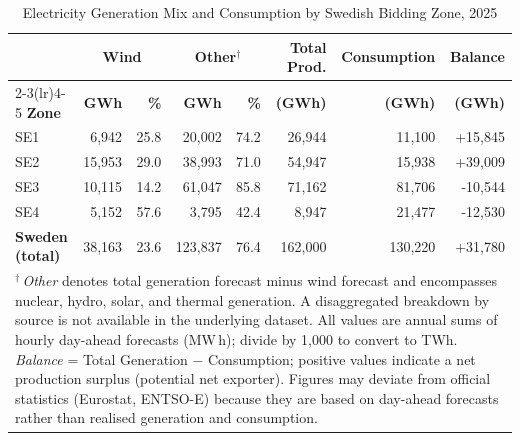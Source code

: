 \begin{table}[htbp]
\centering
\caption{Electricity Generation Mix and Consumption by Swedish Bidding Zone, 2025}
\label{tab:production_mix_2025}
\begin{tabular}{lrrrrrrr}
\toprule
 & \multicolumn{2}{c}{\textbf{Wind}} & \multicolumn{2}{c}{\textbf{Other$^\dagger$}} & \textbf{Total Prod.} & \textbf{Consumption} & \textbf{Balance} \\
\cmidrule(lr){2-3}\cmidrule(lr){4-5}
\textbf{Zone} & \textbf{GWh} & \textbf{\%} & \textbf{GWh} & \textbf{\%} & \textbf{(GWh)} & \textbf{(GWh)} & \textbf{(GWh)} \\
\midrule
SE1 & 6,942 & 25.8 & 20,002 & 74.2 & 26,944 & 11,100 & +15,845 \\
SE2 & 15,953 & 29.0 & 38,993 & 71.0 & 54,947 & 15,938 & +39,009 \\
SE3 & 10,115 & 14.2 & 61,047 & 85.8 & 71,162 & 81,706 & -10,544 \\
SE4 & 5,152 & 57.6 & 3,795 & 42.4 & 8,947 & 21,477 & -12,530 \\
\midrule
\textbf{Sweden (total)} & 38,163 & 23.6 & 123,837 & 76.4 & 162,000 & 130,220 & +31,780 \\
\bottomrule
\multicolumn{8}{p{0.99\linewidth}}{\footnotesize
  $^\dagger$\,\textit{Other} denotes total generation forecast minus wind forecast and encompasses nuclear, hydro, solar, and thermal generation. A disaggregated breakdown by source is not available in the underlying dataset. All values are annual sums of hourly day-ahead forecasts (MW\,h); divide by 1{,}000 to convert to TWh. \textit{Balance} = Total Generation $-$ Consumption; positive values indicate a net production surplus (potential net exporter). Figures may deviate from official statistics (Eurostat, ENTSO-E) because they are based on day-ahead forecasts rather than realised generation and consumption.}
\end{tabular}
\end{table}